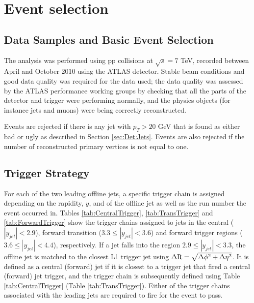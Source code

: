 \section {Event selection}
\label{sec:GBJ2:EvtSel}
\subsection{Data Samples and Basic Event Selection}
The analysis was performed using pp collisions at $\sqrt{s}=7$ TeV, recorded between April and October 2010 using the ATLAS detector.
Stable beam conditions and good data quality was required for the data used; the data quality was assessed by the ATLAS performance working groups by checking that all the parts of the detector and trigger were performing normally, and the physics objects (for instance jets and muons) were being correctly reconstructed. 

Events are rejected if there is any jet with $p_T>20$ GeV that is found as either bad or ugly as described in Section \ref{sec:Det:Jets}. 
Events are also rejected if the number of reconstructed primary vertices is not equal to one.


\subsection{Trigger Strategy}

For each of the two leading offline jets, a specific trigger chain is assigned depending on the rapidity, $y$, and \pt{} of the offline jet as well as the run number the event occurred in.
Tables \ref{tab:CentralTrigger}, \ref{tab:TransTrigger} and \ref{tab:ForwardTrigger} show the trigger chains assigned to jets in the central ($|y_{jet}|<2.9$), forward transition ($3.3\le|y_{jet}|<3.6$) and forward trigger regions ($3.6\le|y_{jet}|<4.4$), respectively.
If a jet falls into the region $2.9\le|y_{jet}|<3.3$, the offline jet is matched to the closest L1 trigger jet using $\mbox{$\Delta{\rm R}$}{}=\sqrt{\mbox{$\Delta{\rm \phi}$}{}^2 + \mbox{$\Delta{\rm \eta}$}{}^2}$.
It is defined as a central (forward) jet  if it is closest to a trigger jet that fired a central (forward) jet trigger, and the trigger chain is subsequently defined using Table \ref{tab:CentralTrigger} (Table \ref{tab:TransTrigger}).
Either of the trigger chains associated with the leading jets are required to fire for the event to pass.

